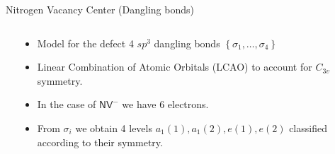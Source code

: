 \begin{frame}{Nitrogen Vacancy Center (Dangling bonds)} %
  \begin{columns}
    \begin{column}{0.5\textwidth}
    \end{column}
    \begin{column}{0.5\textwidth}
      \begin{itemize}
        \item Model for the defect 4 $ sp^{3} $ dangling bonds $ \left \{ \sigma _{1}, \ldots, \sigma _{4} \right \} $
        \item Linear Combination of Atomic Orbitals (LCAO) to
          account for $ C_{3v} $ symmetry.
        \item In the case of $ \mathsf{NV}^{-} $ we have
          6  electrons.
        \item From $ \sigma _{i} $ we obtain 4 levels $ a_1(1), a_1(2), e(1), e(2) $ classified according to their symmetry.

      \end{itemize}
    \end{column}
  \end{columns}
  
\end{frame}

